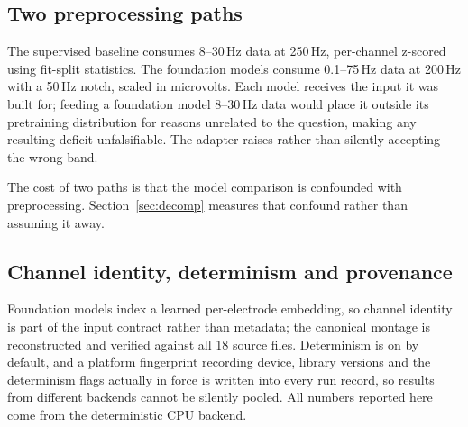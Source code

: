 \subsection{Two preprocessing paths}
\label{sec:twopaths}
The supervised baseline consumes 8--30\,Hz data at 250\,Hz, per-channel
z-scored using fit-split statistics. The foundation models consume
0.1--75\,Hz data at 200\,Hz with a 50\,Hz notch, scaled in microvolts. Each
model receives the input it was built for; feeding a foundation model
8--30\,Hz data would place it outside its pretraining distribution for reasons
unrelated to the question, making any resulting deficit unfalsifiable. The
adapter raises  rather than silently accepting the
wrong band.

The cost of two paths is that the model comparison is confounded with
preprocessing. Section~\ref{sec:decomp} measures that confound rather than
assuming it away.

\subsection{Channel identity, determinism and provenance}
Foundation models index a learned per-electrode embedding, so channel identity
is part of the input contract rather than metadata; the canonical montage is
reconstructed and verified against all 18 source files. Determinism is on by
default, and a platform fingerprint recording device, library versions and the
determinism flags actually in force is written into every run record, so
results from different backends cannot be silently pooled. All numbers reported
here come from the deterministic CPU backend.
